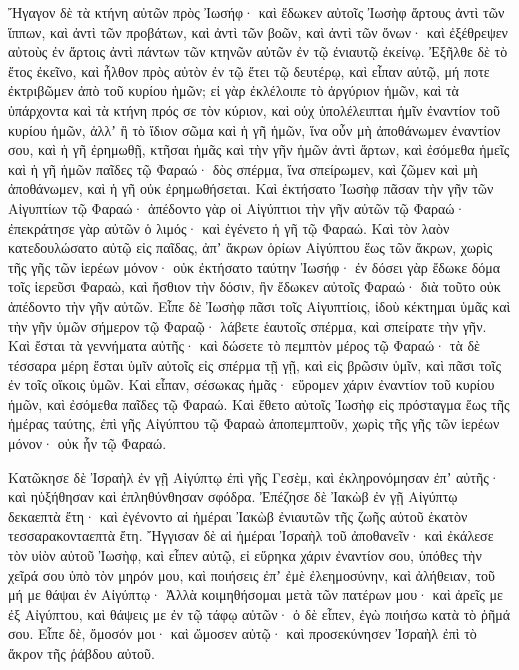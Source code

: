 {Ἤγαγον δὲ τὰ κτήνη αὐτῶν πρὸς Ἰωσήφ· καὶ ἔδωκεν αὐτοῖς Ἰωσὴφ ἄρτους ἀντὶ τῶν ἵππων, καὶ ἀντὶ τῶν προβάτων, καὶ ἀντὶ τῶν βοῶν, καὶ ἀντὶ τῶν ὄνων· καὶ ἐξέθρεψεν αὐτοὺς ἐν ἄρτοις ἀντὶ πάντων τῶν κτηνῶν αὐτῶν ἐν τῷ ἐνιαυτῷ ἐκείνῳ.
Ἐξῆλθε δὲ τὸ ἔτος ἐκεῖνο, καὶ ἦλθον πρὸς αὐτὸν ἐν τῷ ἔτει τῷ δευτέρῳ, καὶ εἶπαν αὐτῷ, μή ποτε ἐκτριβῶμεν ἀπὸ τοῦ κυρίου ἡμῶν; εἰ γὰρ ἐκλέλοιπε τὸ ἀργύριον ἡμῶν, καὶ τὰ ὑπάρχοντα καὶ τὰ κτήνη πρός σε τὸν κύριον, καὶ οὐχ ὑπολέλειπται ἡμῖν ἐναντίον τοῦ κυρίου ἡμῶν, ἀλλʼ ἢ τὸ ἴδιον σῶμα καὶ ἡ γῆ ἡμῶν,
ἵνα οὖν μὴ ἀποθάνωμεν ἐναντίον σου, καὶ ἡ γῆ ἐρημωθῇ, κτῆσαι ἡμᾶς καὶ τὴν γῆν ἡμῶν ἀντὶ ἄρτων, καὶ ἐσόμεθα ἡμεῖς καὶ ἡ γῆ ἡμῶν παῖδες τῷ Φαραώ· δὸς σπέρμα, ἵνα σπείρωμεν, καὶ ζῶμεν καὶ μὴ ἀποθάνωμεν, καὶ ἡ γῆ οὐκ ἐρημωθήσεται.
Καὶ ἐκτήσατο Ἰωσὴφ πᾶσαν τὴν γῆν τῶν Αἰγυπτίων τῷ Φαραώ· ἀπέδοντο γὰρ οἱ Αἰγύπτιοι τὴν γῆν αὐτῶν τῷ Φαραώ· ἐπεκράτησε γὰρ αὐτῶν ὁ λιμός· καὶ ἐγένετο ἡ γῆ τῷ Φαραώ.
Καὶ τὸν λαὸν κατεδουλώσατο αὐτῷ εἰς παῖδας, ἀπʼ ἄκρων ὁρίων Αἰγύπτου ἕως τῶν ἄκρων,
χωρὶς τῆς γῆς τῶν ἱερέων μόνον· οὐκ ἐκτήσατο ταύτην Ἰωσήφ· ἐν δόσει γὰρ ἔδωκε δόμα τοῖς ἱερεῦσι Φαραὼ, καὶ ἤσθιον τὴν δόσιν, ἣν ἔδωκεν αὐτοῖς Φαραώ· διὰ τοῦτο οὐκ ἀπέδοντο τὴν γῆν αὐτῶν.
Εἶπε δὲ Ἰωσὴφ πᾶσι τοῖς Αἰγυπτίοις, ἰδοὺ κέκτημαι ὑμᾶς καὶ τὴν γῆν ὑμῶν σήμερον τῷ Φαραῷ· λάβετε ἑαυτοῖς σπέρμα, καὶ σπείρατε τὴν γῆν.
Καὶ ἔσται τὰ γεννήματα αὐτῆς· καὶ δώσετε τὸ πεμπτὸν μέρος τῷ Φαραώ· τὰ δὲ τέσσαρα μέρη ἔσται ὑμῖν αὐτοῖς εἰς σπέρμα τῇ γῇ, καὶ εἰς βρῶσιν ὑμῖν, καὶ πᾶσι τοῖς ἐν τοῖς οἴκοις ὑμῶν.
Καὶ εἶπαν, σέσωκας ἡμᾶς· εὕρομεν χάριν ἐναντίον τοῦ κυρίου ἡμῶν, καὶ ἐσόμεθα παῖδες τῷ Φαραώ.
Καὶ ἔθετο αὐτοῖς Ἰωσὴφ εἰς πρόσταγμα ἕως τῆς ἡμέρας ταύτης, ἐπὶ γῆς Αἰγύπτου τῷ Φαραὼ ἀποπεμπτοῦν, χωρὶς τῆς γῆς τῶν ἱερέων μόνον· οὐκ ἧν τῷ Φαραώ.
\par }{\PP {}Κατῶκησε δὲ Ἰσραὴλ ἐν γῇ Αἰγύπτῳ ἐπὶ γῆς Γεσὲμ, καὶ ἐκληρονόμησαν ἐπʼ αὐτῆς· καὶ ηὐξήθησαν καὶ ἐπληθύνθησαν σφόδρα.
Ἐπέζησε δὲ Ἰακὼβ ἐν γῇ Αἰγύπτῳ δεκαεπτὰ ἔτη· καὶ ἐγένοντο αἱ ἡμέραι Ἰακὼβ ἐνιαυτῶν τῆς ζωῆς αὐτοῦ ἑκατὸν τεσσαρακονταεπτὰ ἔτη.
Ἤγγισαν δὲ αἱ ἡμέραι Ἰσραὴλ τοῦ ἀποθανεῖν· καὶ ἐκάλεσε τὸν υἱὸν αὐτοῦ Ἰωσὴφ, καὶ εἶπεν αὐτῷ, εἰ εὕρηκα χάριν ἐναντίον σου, ὑπόθες τὴν χεῖρά σου ὑπὸ τὸν μηρόν μου, καὶ ποιήσεις ἐπʼ ἐμὲ ἐλεημοσύνην, καὶ ἀλήθειαν, τοῦ μή με θάψαι ἐν Αἰγύπτῳ·
Ἀλλὰ κοιμηθήσομαι μετὰ τῶν πατέρων μου· καὶ ἀρεῖς με ἐξ Αἰγύπτου, καὶ θάψεις με ἐν τῷ τάφῳ αὐτῶν· ὁ δὲ εἶπεν, ἐγὼ ποιήσω κατὰ τὸ ῥῆμά σου.
Εἶπε δὲ, ὄμοσόν μοι· καὶ ὤμοσεν αὐτῷ· καὶ προσεκύνησεν Ἰσραὴλ ἐπὶ τὸ ἄκρον τῆς ῥάβδου αὐτοῦ.

}
